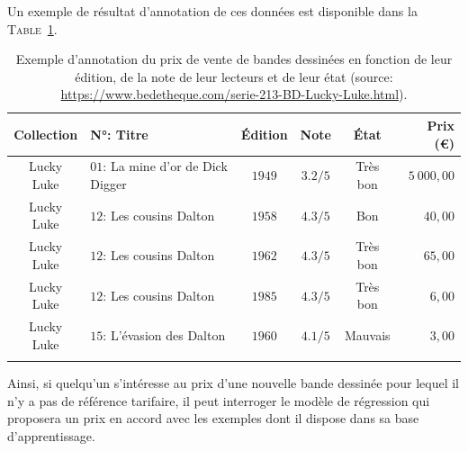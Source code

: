 			Un exemple de résultat d'annotation de ces données est disponible dans la \textsc{Table~\ref{table:2.1.2.A-PRESENTATION-ANNOTATION-EXEMPLES-REGRESSION}}.
			\begin{leftBarExamples}
				\begin{table}[H]  %
					\begin{center}
					\def\arraystretch{0.8}  %
					\begin{tabular}{|c|l|c|c|c|r|}
					
					\hline
					\rowcolor{colorLeftBarExamples!25}
					Collection
						& N°: Titre
						& Édition
						& Note
						& État
						& Prix (€)
						\tabularnewline
						\hline \hline
					Lucky Luke
						& $01$: La mine d'or de Dick Digger
						& $1949$
						& $3.2/5$
						& Très bon
						& $5~000,00$
						\tabularnewline
						\hline
					Lucky Luke
						& $12$: Les cousins Dalton
						& $1958$
						& $4.3/5$
						& Bon
						& $40,00$
						\tabularnewline
						\hline
					Lucky Luke
						& $12$: Les cousins Dalton
						& $1962$
						& $4.3/5$
						& Très bon
						& $65,00$
						\tabularnewline
						\hline
					Lucky Luke
						& $12$: Les cousins Dalton
						& $1985$
						& $4.3/5$
						& Très bon
						& $6,00$
						\tabularnewline
						\hline
					Lucky Luke
						& $15$: L'évasion des Dalton
						& $1960$
						& $4.1/5$
						& Mauvais
						& $3,00$
						\tabularnewline
						\hline
					\multicolumn{6}{|c|}{ \shortstack{ ... } }
						\tabularnewline
						\hline
				
					\end{tabular}
					\end{center}
					\caption{
						Exemple d'annotation du prix de vente de bandes dessinées en fonction de leur édition, de la note de leur lecteurs et de leur état (source: \url{https://www.bedetheque.com/serie-213-BD-Lucky-Luke.html}).
					}
					\label{table:2.1.2.A-PRESENTATION-ANNOTATION-EXEMPLES-REGRESSION}
				\end{table}
			\end{leftBarExamples}
			
			Ainsi, si quelqu'un s'intéresse au prix d'une nouvelle bande dessinée pour lequel il n'y a pas de référence tarifaire, il peut interroger le modèle de régression qui proposera un prix en accord avec les exemples dont il dispose dans sa base d'apprentissage.
			
